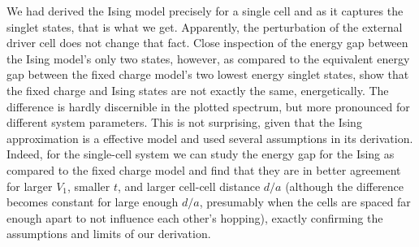 We had derived the Ising model precisely for a single cell and as it captures
the singlet states, that is what we get. Apparently, the perturbation of the
external driver cell does not change that fact. Close inspection of the energy
gap between the Ising model's only two states, however, as compared to the
equivalent energy gap between the fixed charge model's two lowest energy singlet
states, show that the fixed charge and Ising states are not exactly the same,
energetically. The difference is hardly discernible in the plotted spectrum, but
more pronounced for different system parameters. This is not surprising, given
that the Ising approximation is a effective model and used several assumptions
in its derivation. Indeed, for the single-cell system we can study the energy
gap for the Ising as compared to the fixed charge model and find that they are
in better agreement for larger $V_1$, smaller $t$, and larger cell-cell distance
$d/a$ (although the difference becomes constant for large enough $d/a$,
presumably when the cells are spaced far enough apart to not influence each
other's hopping), exactly confirming the assumptions and limits of our
derivation.



% 


